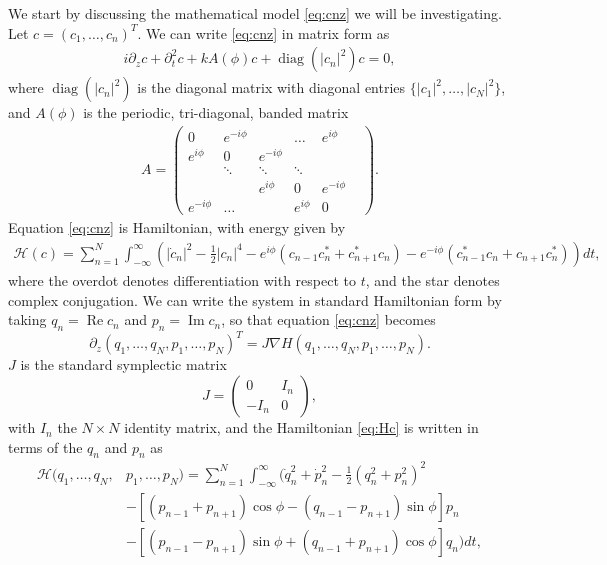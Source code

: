 \documentclass[11pt,reqno]{amsart}
\def\calH{{\mathcal H}}
\DeclareMathOperator{\diag}{diag}
\DeclareMathOperator{\RR}{Re}
\DeclareMathOperator{\II}{Im}
\begin{document}
We start by discussing the mathematical model \cref{eq:cnz} we will be investigating. Let $c = (c_1, \dots, c_n)^T$. We can write \cref{eq:cnz} in matrix form as
\begin{align}\label{eq:cz}
i \partial_z c + \partial_t^2 c + k A(\phi) c + \diag\left(|c_n|^2\right)c = 0,
\end{align}
where $\diag\left(|c_n|^2\right)$ is the diagonal matrix with diagonal entries $\{|c_1|^2, \dots, |c_N|^2\}$, and $A(\phi)$ is the periodic, tri-diagonal, banded matrix
\begin{align}
A = \begin{pmatrix}
0 & e^{-i \phi} & & \dots & e^{i \phi} \\
e^{i \phi} & 0 & e^{-i \phi} & & & \\
& \ddots & \ddots & \ddots &  & \\
 & &e^{i \phi}  & 0 & e^{-i \phi}  \\
e^{-i \phi}& \dots & & e^{i \phi} & 0
\end{pmatrix}.
\end{align}
Equation \cref{eq:cnz} is Hamiltonian, with energy given by
\begin{align}\label{eq:Hc}
\calH(c) = \sum_{n=1}^N \int_{-\infty}^\infty 
\left(
|\dot{c}_n|^2 - \frac{1}{2}|c_n|^4 - e^{i\phi}( c_{n-1}c_n^* + c_{n+1}^* c_n) 
- e^{-i \phi}( c_{n-1}^*c_n + c_{n+1} c_n^*) \right) dt,
\end{align}
where the overdot denotes differentiation with respect to $t$, and the star denotes complex conjugation. We can write the system in standard Hamiltonian form by taking $q_n = \RR c_n$ and $p_n = \II c_n$, so that equation \cref{eq:cnz} becomes
\begin{equation}
\partial_z (q_1, \dots, q_N, p_1, \dots, p_N)^T
 = J \nabla H(q_1, \dots, q_N, p_1, \dots, p_N).
\end{equation}
$J$ is the standard symplectic matrix
\[
J = \begin{pmatrix}
0 & I_n \\ -I_n & 0
\end{pmatrix},
\]
with $I_n$ the $N \times N$ identity matrix, and the Hamiltonian \cref{eq:Hc} is written in terms of the $q_n$ and $p_n$ as
\begin{equation}\label{eq:Hqp}
\begin{aligned}
\calH(q_1, \dots, q_N, &p_1, \dots, p_N) = \sum_{n=1}^N \int_{-\infty}^\infty 
\Big(
\dot{q}_n^2 + \dot{p}_n^2 - \frac{1}{2}(q_n^2 + p_n^2)^2 \\
&- \left[(p_{n-1} + p_{n+1}) \cos\phi - (q_{n-1} - p_{n+1}) \sin \phi\right] p_n \\
&- \left[(p_{n-1} - p_{n+1}) \sin\phi + (q_{n-1} + p_{n+1}) \cos \phi\right] q_n
\Big) dt,
\end{aligned}
\end{equation}
\end{document}

